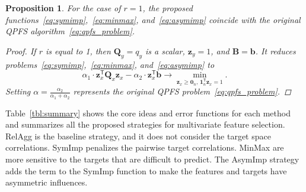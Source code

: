 \documentclass[12pt,twoside]{article}
\newtheorem{proposition}{Proposition}
\theoremstyle{definition}
\newcommand{\bz}{\mathbf{z}}
\newcommand{\bb}{\mathbf{b}}
\newcommand{\bB}{\mathbf{B}}
\newcommand{\bQ}{\mathbf{Q}}
\newcommand{\T}{\mathsf{T}}
\newcommand{\bOne}{\boldsymbol{1}}
\newcommand{\bZero}{\boldsymbol{0}}
\begin{document}
\begin{proposition}
	For the case of $r=1$, the proposed functions~\eqref{eq:symimp},~\eqref{eq:minmax}, and~\eqref{eq:asymimp} coincide with the original QPFS algorithm~\eqref{eq:qpfs_problem}.
	
	\begin{proof}
		If $r$ is equal to 1, then $\bQ_y = q_y$ is a scalar, $\bz_y = 1$, and $\bB = \bb$. It reduces problems~\eqref{eq:symimp},~\eqref{eq:minmax}, and~\eqref{eq:asymimp} to
		\begin{equation*}
		\alpha_1 \cdot \bz_x^{\T} \bQ_x \bz_x - \alpha_2 \cdot \bz_x^{\T} \bb \rightarrow \min_{\bz_x \geq \bZero_n, \, \bOne_n^{\T}\bz_x=1} .
		\end{equation*}
		Setting $\alpha = \frac{\alpha_2}{\alpha_1 + \alpha_2}$ represents the original QPFS problem~\eqref{eq:qpfs_problem}.
	\end{proof}
\end{proposition}

Table~\ref{tbl:summary} shows the core ideas and error functions for each method and summarizes all the proposed strategies for multivariate feature selection. 
RelAgg is the baseline strategy, and it does not consider the target space correlations.
SymImp penalizes the pairwise target correlations.
MinMax are more sensitive to the targets that are difficult to predict.
The AsymImp strategy adds the term to the SymImp function to make the features and targets have asymmetric influences. 
\end{document}
